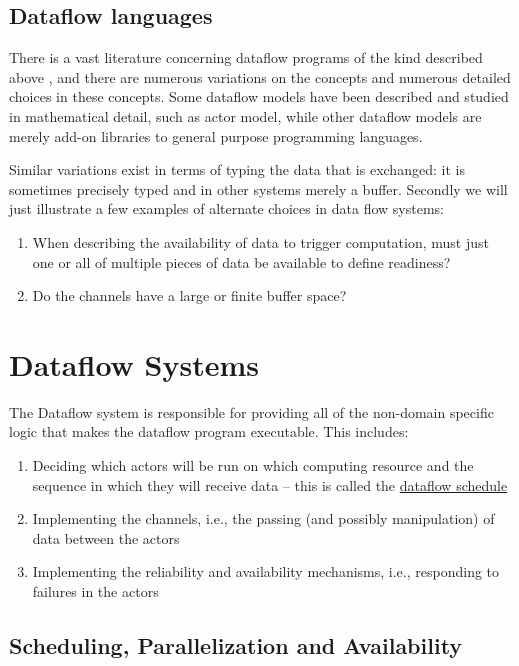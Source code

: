 \documentclass[11pt,a4paper]{article}
\begin{document}
\subsection{Dataflow languages}

There is a vast literature concerning dataflow programs of the kind
described above \citep[see the review
by][]{Johnston:2004:ADP:1013208.1013209}, and there are numerous
variations on the concepts and numerous detailed choices in these
concepts.  Some dataflow models have been described and studied in
mathematical detail, such as \cite{Hewitt:1973:UMA:1624775.1624804}
actor model, while other dataflow models are merely add-on libraries
to general purpose programming languages.

Similar variations exist in terms of typing the data that is
exchanged: it is sometimes precisely typed and in other systems merely
a buffer. Secondly we will just illustrate a few examples of alternate
choices in data flow systems:
\begin{enumerate}
  \item When describing the availability of data
  to trigger computation, must just one or all of multiple pieces of
  data be available to define readiness?  
\item Do the channels have a large or finite buffer space?
\end{enumerate}


\section{Dataflow Systems}

The Dataflow system is responsible for providing all of the non-domain
specific logic that makes the dataflow program executable. This
includes:
\begin{enumerate}
\item Deciding which actors will be run on which computing resource
  and the sequence in which they will receive data -- this is called
  the \underline{dataflow schedule}
\item Implementing the channels, i.e., the passing (and possibly
  manipulation) of data between the actors
\item Implementing the reliability and availability mechanisms, i.e.,
  responding to failures in the actors 
\end{enumerate}

\subsection{Scheduling, Parallelization and Availability}
\end{document}
